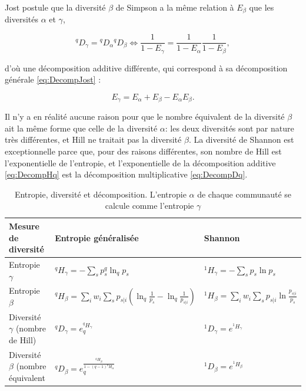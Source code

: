 \documentclass[
  11pt,
  french,
  a4paper,
  extrafontsizes,onecolumn,openright
  ]{memoir}
\begin{document}
Jost postule que la diversité \(\beta\) de Simpson a la même relation à \(E_{\beta}\) que les diversités \(\alpha\) et \(\gamma\),

\begin{equation}
  \label{eq:Dqgamma}
  ^{q}\!D_{\gamma} = {^{q}\!D_{\alpha}}{^{q}\!D_{\beta}} \Leftrightarrow \frac{1}{1-E_{\gamma}}=\frac{1}{1-E_{\alpha}}\frac{1}{1-E_{\beta}},
\end{equation}

d'où une décomposition additive différente, qui correspond à sa décomposition générale \eqref{eq:DecompJost} :

\begin{equation}
  \label{eq:Egamma}
  E_{\gamma}=E_{\alpha}+E_{\beta}-{E_{\alpha}}{E_{\beta}}.
\end{equation}

Il n'y a en réalité aucune raison pour que le nombre équivalent de la diversité \(\beta\) ait la même forme que celle de la diversité \(\alpha\): les deux diversités sont par nature très différentes, et Hill ne traitait pas la diversité \(\beta\).
La diversité de Shannon est exceptionnelle parce que, pour des raisons différentes, son nombre de Hill est l'exponentielle de l'entropie, et l'exponentielle de la décomposition additive \eqref{eq:DecompHq} est la décomposition multiplicative \eqref{eq:DecompDq}.



\scriptsize

\begin{table}

\caption{\label{tab:Decomposition}Entropie, diversité et décomposition. L'entropie \(\alpha\) de chaque communauté se calcule comme l'entropie \(\gamma\)}
\centering
\fontsize{6}{8}\selectfont
\begin{tabu} to 
\toprule
Mesure de diversité & Entropie généralisée & Shannon\\
\midrule
Entropie $\gamma$ & $^{q}\!H_{\gamma}=-\sum_s{p^q_s}\ln_q{p_s}$ & $^{1}\!H_{\gamma}=-\sum_s{p_s}\ln{p_s}$\\
Entropie $\beta$ & $^{q}\!H_{\beta}=\sum_i{w_i\sum_s{p_{s|i}\left(\ln_q\frac{1}{p_s}-\ln_q\frac{1}{p_{s|i}}\right)}}$ & $^{1}\!H_{\beta}=\sum_i{w_i\sum_s{p_{s|i}\ln\frac{p_{s|i}}{p_s}}}$\\
Diversité $\gamma$ (nombre de Hill) & $^{q}\!D_{\gamma}=e^{^q\!H_{\gamma}}_q$ & $^{1}\!D_{\gamma}=e^{^1\!H_\gamma}$\\
Diversité $\beta$ (nombre équivalent & $^{q}\!D_{\beta}=e^{\frac{^{q}\!H_{\beta}}{1-(q-1)^{q}\!H_{\alpha}}}_q$ & $^{1}\!D_{\beta}=e^{^{1}\!H_{\beta}}$\\
\bottomrule
\end{tabu}
\end{table}
\end{document}
